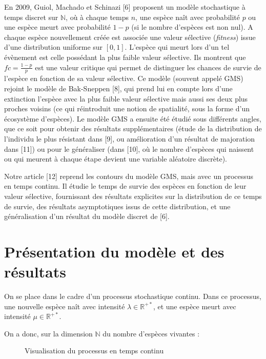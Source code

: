 \documentclass[12pt,a4paper]{article}
\begin{document}
En 2009, Guiol, Machado et Schinazi [6] proposent un modèle stochastique à temps discret sur $\mathbb{N}$, où à chaque temps $n$, une espèce naît avec probabilité $p$ ou une espèce meurt avec probabilité $1-p$ (si le nombre d’espèces est non nul). A chaque espèce nouvellement créée est associée une valeur sélective (\textit{fitness}) issue d’une distribution uniforme sur $[0,1]$. L’espèce qui meurt lors d’un tel évènement est celle possédant la plus faible valeur sélective. Ils montrent que $fc=\frac{1-p}{p}$ est une valeur critique qui permet de distinguer les chances de survie de l’espèce en fonction de sa valeur sélective. 
Ce modèle (souvent appelé GMS) rejoint le modèle de Bak-Sneppen [8], qui prend lui en compte lors d’une extinction l’espèce avec la plus faible valeur sélective mais aussi ses deux plus proches voisins (ce qui réintroduit une notion de spatialité, sous la forme d’un écosystème d’espèces). Le modèle GMS a ensuite été étudié sous différents angles, que ce soit pour obtenir des résultats supplémentaires (étude de la distribution de l’individu le plus résistant dans [9], ou amélioration d’un résultat de majoration dans [11]) ou pour le généraliser (dans [10], où le nombre d’espèces qui naissent ou qui meurent à chaque étape devient une variable aléatoire discrète).\par

Notre article [12] reprend les contours du modèle GMS, mais avec un processus en temps continu. Il étudie le temps de survie des espèces en fonction de leur valeur sélective, fournissant des résultats explicites sur la distribution de ce temps de survie, des résultats asymptotiques issus de cette distribution, et une généralisation d’un résultat du modèle discret de [6]. 

\newpage

\section{Présentation du modèle et des résultats}

On se place dans le cadre d’un processus stochastique continu. Dans ce processus, une nouvelle espèce naît avec intensité $\lambda \in \mathbb{R}^{+*}$, et une espèce meurt avec intensité $\mu \in \mathbb{R}^{+*}$.

On a donc, sur la dimension $\mathbb{N}$ du nombre d'espèces vivantes :
\begin{figure}[!htb]
        \caption{\label{fig : my-label} Visualisation du processus en temps continu}
      \end{figure}
\end{document}
